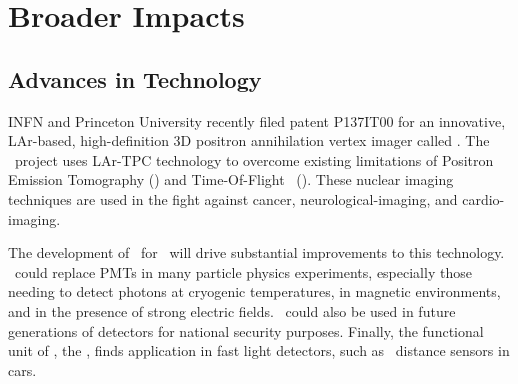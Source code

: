 \section{Broader Impacts}
\label{sec:BroaderImpact}




\subsection{Advances in Technology}


INFN and Princeton University recently filed patent P137IT00 for an innovative, LAr-based, high-definition 3D positron annihilation vertex imager called \ThreeDPi. The \ThreeDPi\ project uses LAr-TPC technology to overcome existing limitations of Positron Emission Tomography (\PET) and Time-Of-Flight \PET\ (\TOFPET). These nuclear imaging techniques are used in the fight against cancer, neurological-imaging, and cardio-imaging.  

The development of \SiPMs\ for \DSs\ will drive substantial improvements to this technology.  \SiPMs\ could replace PMTs in many particle physics experiments, especially those needing to detect photons at cryogenic temperatures, in magnetic environments, and in the presence of strong electric fields. \SiPMs\ could also be used in future generations of detectors for national security purposes. Finally, the functional unit of \SiPMs, the \SPAD, finds application in fast light detectors, such as \LiDaR\ distance sensors in cars.

